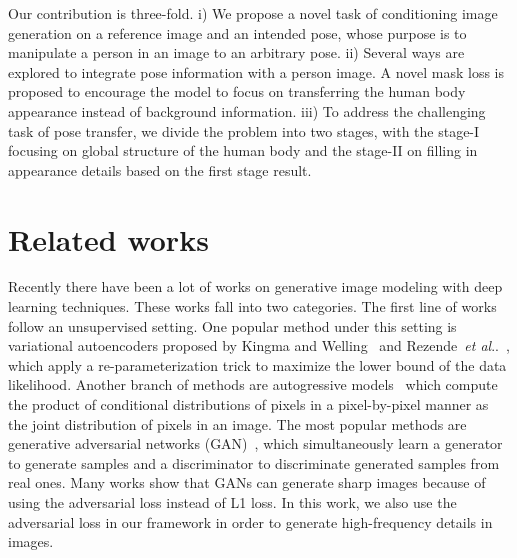 \documentclass{article}
\makeatletter
\DeclareRobustCommand\onedot{\futurelet\@let@token\@onedot}
\def\@onedot{\ifx\@let@token.\else.\null\fi\xspace}
\def\etal{\emph{et al}\onedot}
\makeatother
\begin{document}
Our contribution is three-fold. i) We propose a novel task of conditioning image generation on a reference image and an intended pose, whose purpose is to manipulate a person in an image to an arbitrary pose. ii) Several ways are explored to integrate pose information with a person image. A novel mask loss is proposed to encourage the model to focus on transferring the human body appearance instead of background information.
iii) To address the challenging task of pose transfer, we divide the problem into two stages, with the stage-I focusing on global structure of the human body and the stage-II on filling in appearance details based on the first stage result. \section{Related works}
\label{related}
Recently there have been a lot of works on generative image modeling with deep learning techniques. These works fall into two categories.
The first line of works follow an unsupervised setting. One popular method under this setting is variational autoencoders proposed by Kingma and Welling~\cite{VariationalAE} and Rezende~\etal~\cite{Rezende-ICML14-VAE}, which apply a re-parameterization trick to maximize the lower bound of the data likelihood. Another branch of methods are autogressive models~\cite{NADE, Oord2016-pixelRNN,Oord2016-PixelCNN} which compute the product of conditional distributions of pixels in a pixel-by-pixel manner as the joint distribution of pixels in an image. The most popular methods are generative adversarial networks (GAN)~\cite{GAN-2014nips}, which simultaneously learn a generator to generate samples and a discriminator to discriminate generated samples from real ones. Many works show that GANs can generate sharp images because of using the adversarial loss instead of L1 loss. In this work, we also use the adversarial loss in our framework in order to generate high-frequency details in images.
\end{document}

